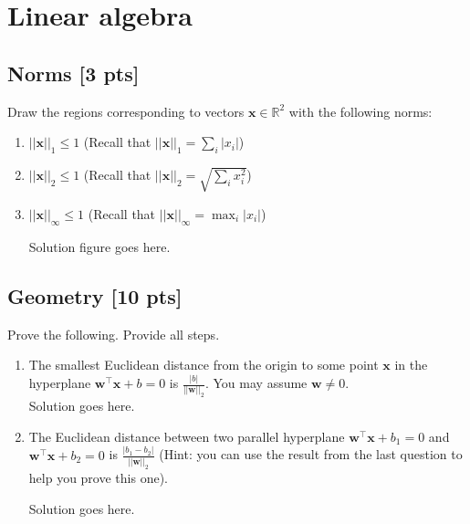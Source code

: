 \documentclass[a4paper]{article}
\theoremstyle{definition}
\newcommand{\RR}{\mathbb{R}}
\newenvironment{soln}{
    \leavevmode\color{blue}\ignorespaces
}{}
\begin{document}
\section{Linear algebra}


\subsection{Norms [3 pts]}
Draw the regions corresponding to vectors $\mathbf{x}\in\RR^2$ with the following norms:
\begin{enumerate}
	\item 	$||\mathbf{x}||_1\leq 1$ (Recall that $||\mathbf{x}||_1 = \sum_i |x_i|$)
	\item 	$||\mathbf{x}||_2 \leq 1$ (Recall that $||\mathbf{x}||_2 =\sqrt{\sum_i x_i^2}$)
	\item 	$||\mathbf{x}||_\infty \leq 1$ (Recall that $||\mathbf{x}||_\infty = \max_i |x_i|$)
	
	\begin{soln}
	    Solution figure goes here.\\
	\end{soln}
\end{enumerate}




\subsection{Geometry [10 pts]}
Prove the following.  Provide all steps.
\begin{enumerate}
\item 	The smallest Euclidean distance from the origin to some point $\mathbf{x}$ in the hyperplane $\mathbf{w}^\top\mathbf{x} + b = 0$ is $\frac{|b|}{||\mathbf{w}||_2}$.  You may assume $\mathbf{w} \neq 0$.\\
\begin{soln}  Solution goes here. \end{soln}

\item 	The Euclidean distance between two parallel hyperplane $\mathbf{w}^\top\mathbf{x} + b_1 = 0$ and $\mathbf{w}^\top\mathbf{x} + b_2 = 0$ is $\frac{|b_1 - b_2|}{||\mathbf{w}||_2}$ (Hint: you can use the result from the last question to help you prove this one).

\begin{soln}  Solution goes here. \end{soln}

\end{enumerate}
\end{document}
